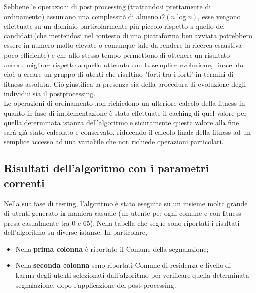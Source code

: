             Sebbene le operazioni di post processing (trattandosi prettamente di ordinamento) assumano una complessità di almeno $\mathcal{O}(n\log{}n)$, esse vengono effettuate su un dominio particolarmente più piccolo rispetto a quello dei candidati (che mettendosi nel contesto di una piattaforma ben avviata potrebbero essere in numero molto elevato o comunque tale da rendere la ricerca esaustiva poco efficiente) e che allo stesso tempo permettono di ottenere un risultato ancora migliore rispetto a quello ottenuto con la semplice evoluzione, riuscendo cioè a creare un gruppo di utenti che risultino "forti tra i forti" in termini di fitness assoluta. Ciò giustifica la presenza sia della procedura di evoluzione degli individui sia il postprocessing. \\ 
            Le operazioni di ordinamento non richiedono un ulteriore calcolo della fitness in quanto in fase di implementazione è stato effettuato il caching di quel valore per quella determinata istanza dell'algoritmo e sicuramente questo valore alla fine sarà già stato calcolato e conservato, riducendo il calcolo finale della fitness ad un semplice accesso ad una variabile che non richiede operazioni particolari.


    \subsection{Risultati dell'algoritmo con i parametri correnti}
        Nella sua fase di testing, l'algoritmo è stato eseguito su un insieme molto grande di utenti generato in maniera casuale (un utente per ogni comune e con fitness presa casualmente tra 0 e 65). Nella tabella che segue sono riportati i risultati dell'algoritmo su diverse istanze. In particolare, 

        \begin{itemize}
            \item Nella \textbf{prima colonna} è riportato il Comune della segnalazione;
            \item Nella \textbf{seconda colonna} sono riportati Comune di residenza e livello di karma degli utenti selezionati dall'algoritmo per verificare quella determinata segnalazione, dopo l'applicazione del post-processing.
        \end{itemize}

